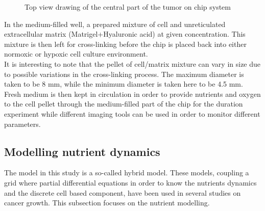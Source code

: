 \documentclass[11pt,a4paper]{article}
\begin{document}
\begin{figure}
\begin{center}

\caption{Top view drawing of the central part of the tumor on chip system \label{toc}}
\end{center}
\end{figure}
In the medium-filled well, a prepared mixture of cell and unreticulated extracellular matrix (Matrigel+Hyaluronic acid) at given concentration. This mixture is then left for cross-linking before the chip is placed back into either normoxic or hypoxic cell culture environment.\\

It is interesting to note that the pellet of cell/matrix mixture can vary in size due to possible variations in the cross-linking process. The maximum diameter is taken to be 8 mm, while the minimum diameter is taken here to be 4.5 mm.\\

Fresh medium is then kept in circulation in order to provide nutrients and oxygen to the cell pellet through the medium-filled part of the chip for the duration experiment while different imaging tools can be used in order to monitor different parameters.\\

\subsection{Modelling nutrient dynamics}
The model in this study is a so-called hybrid model. These models, coupling a grid where partial differential equations in order to know the nutrients dynamics  and the discrete cell based component, have been used in several studies on cancer growth.\cite{Mao2018}\cite{Kempf2015}\cite{Jagiella2016} This subsection focuses on the nutrient modelling.\\
\end{document}
